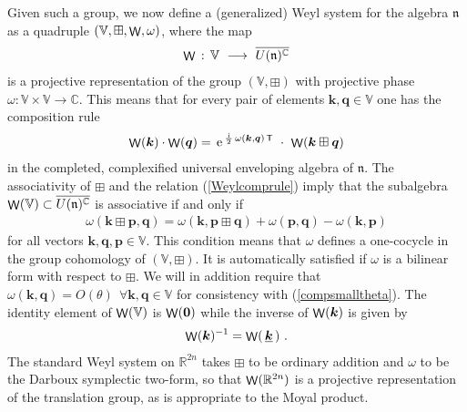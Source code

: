 \documentclass[11pt,a4paper]{article}
\DeclareMathOperator{\weyl}{{\sf W}}                   %
\newcommand{\comp}{\boxplus}                            %
\newcommand{\mbf}[1]{{\boldsymbol {#1} }}
\def\ii{{\,{\rm i}\,}}
\def\T{{\sf T}}
\def\mk{{\mbf k}}
\def\mq{{\mbf q}}
\def\mfn{{\mathfrak n}}
\def\mbbV{{\mathbb V}}
\newcommand{\complex}{{\mathbb C}} %
\newcommand{\real}{{\mathbb R}} %
\def\e{{\,\rm e}\,}
\newcommand{\beq}{\begin{eqnarray}}
\newcommand{\eeq}{\end{eqnarray}}
\begin{document}
Given such a group, we now define a (generalized) Weyl system for the
algebra $\mfn$ as a quadruple
$(\mathbb{V},\comp,\weyl,\omega)$, where the map
\beq
\weyl\,:\,\mathbb{V}~\longrightarrow~\overline{U(\mfn)^\complex}
\label{genweylmapdef}\eeq
is a projective representation of the group
$(\mathbb{V},\comp)$ with projective phase
$\omega:\mathbb{V}\times\mathbb{V}\to\complex$. This means that for
every pair of elements $\mk,\mq\in\mathbb{V}$ one has the composition
rule
\beq
\weyl(\mk)\cdot\weyl(\mq)=\e^{\frac\ii2\,\omega(\mk,\mq)\,\T}~\cdot~
\weyl(\mk\comp\mq)
\label{Weylcomprule}\eeq
in the completed, complexified universal enveloping algebra of
$\mfn$. The associativity of $\comp$ and the relation
(\ref{Weylcomprule}) imply that the subalgebra
$\weyl(\mathbb{V})\subset\overline{U(\mfn)^\complex}$ is
associative if and only if
\beq
\omega(\mk\comp\mbf p,\mq)=\omega(\mk,\mbf p\comp\mq)+\omega(\mbf p,\mq)-
\omega(\mk,\mbf p)
\label{cocyclecond}\eeq
for all vectors $\mk,\mq,\mbf p\in\mbbV$. This condition means that
$\omega$ defines a one-cocycle in the group cohomology
of $(\mathbb{V},\comp)$. It is automatically satisfied if
$\omega$ is a bilinear form with respect to $\comp$. We will in
addition require that $\omega(\mk,\mq)=O(\theta)~~\forall
\mk,\mq\in\mathbb{V}$ for consistency with
(\ref{compsmalltheta}). The identity element of $\weyl(\mathbb{V})$
is $\weyl(\mbf0)$ while the inverse of $\weyl(\mk)$ is given by
\beq
\weyl(\mk)^{-1}=\weyl(\,\underline{\mk}\,) \ .
\label{weylinverse}\eeq
The standard Weyl system on $\real^{2n}$ takes $\comp$ to be ordinary
addition and $\omega$ to be the Darboux symplectic two-form, so that
$\weyl(\real^{2n})$ is a projective representation of the translation
group, as is appropriate to the Moyal product.
\end{document}
